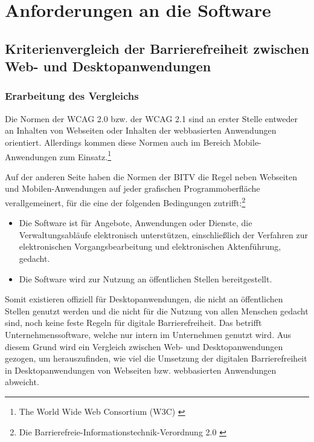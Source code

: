 \section{Anforderungen an die Software}

\subsection{Kriterienvergleich der Barrierefreiheit zwischen Web- und Desktopanwendungen}
\label{subsec: Kriterienvergleich der Barrierefreiheit zwischen Web- und Desktopanwendungen}

\subsubsection{Erarbeitung des Vergleichs}

Die Normen der \ac{WCAG} 2.0 bzw. der \ac{WCAG} 2.1 sind an erster Stelle entweder an Inhalten von Webseiten oder Inhalten der webbasierten Anwendungen orientiert. Allerdings kommen diese Normen auch im Bereich Mobile-Anwendungen zum Einsatz.\footnote{The World Wide Web Consortium (W3C) \cite{w3c}}

Auf der anderen Seite haben die Normen der \ac{BITV} die Regel neben Webseiten und Mobilen-Anwendungen auf jeder grafischen Programmoberfläche verallgemeinert, für die eine der folgenden Bedingungen zutrifft:\footnote{Die Barrierefreie-Informationstechnik-Verordnung 2.0 \cite{BITV}}

\begin{itemize}
	\item Die Software ist für Angebote, Anwendungen oder Dienste, die Verwaltungsabläufe elektronisch unterstützen, einschließlich der Verfahren zur elektronischen Vorgangsbearbeitung 
	und elektronischen Aktenführung, gedacht.
	\item Die Software wird zur Nutzung an öffentlichen Stellen bereitgestellt.
\end{itemize}

Somit existieren offiziell für Desktopanwendungen, die nicht an öffentlichen Stellen genutzt werden und die nicht für die Nutzung von allen Menschen gedacht sind, noch keine feste Regeln für digitale Barrierefreiheit. Das betrifft Unternehmenssoftware, welche nur intern im Unternehmen genutzt wird. Aus diesem Grund wird ein Vergleich zwischen Web- und Desktopanwendungen gezogen, um herauszufinden, wie viel die Umsetzung der digitalen Barrierefreiheit in Desktopanwendungen von Webseiten bzw. webbasierten Anwendungen abweicht.

